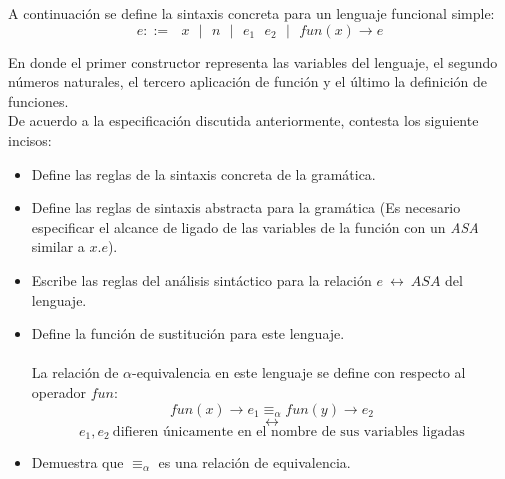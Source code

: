     \bigskip

   \begin{exercise}
        A continuación se define la sintaxis concreta para un lenguaje funcional simple:
        \[ e ::=  \text{ $x$ } \text{$|$} \text{ $n$  }\text{$|$} \text{ } e_1 \text{ } e_2 \text{ } \text{$|$} \text{ } fun(x) \rightarrow e \]

    En donde el primer constructor representa las variables del lenguaje, el segundo números naturales,
    el tercero aplicación de función y el último la definición de funciones.\\

    De acuerdo a la especificación discutida anteriormente, contesta los siguiente incisos: \\
    \begin{itemize}
        \item Define las reglas de la sintaxis concreta de la gramática.
        \item Define las reglas de sintaxis abstracta para la gramática (Es necesario especificar el alcance de ligado de las variables de la función con un \textit{ASA} similar a $x.e$).
        \item Escribe las reglas del análisis sintáctico  para la relación $e \ \longleftrightarrow\ ASA$ del lenguaje.
        \item Define la función de sustitución para este lenguaje. \\\\
        La relación de $\alpha$-equivalencia en este lenguaje se define con respecto al operador $fun$:
             \[ fun(x) \rightarrow e_1 \equiv_\alpha fun(y) \rightarrow e_2   \]
	  \[  \longleftrightarrow  \]
	  \[e_1, e_2 \  \text{difieren únicamente en el nombre de sus variables ligadas}\]
             \item Demuestra que $\equiv_\alpha$ es una relación de equivalencia.
    \end{itemize}

   \end{exercise}
    